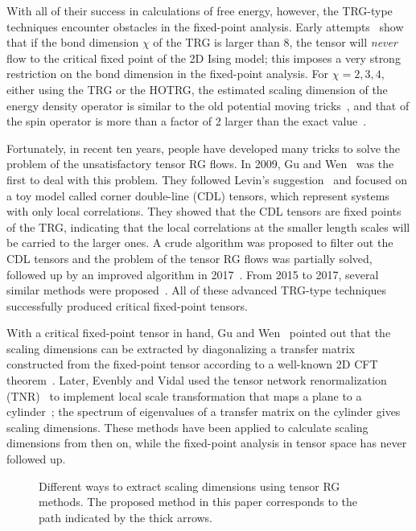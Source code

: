 \documentclass[aps,prr,reprint,superscriptaddress,floatfix]{revtex4-2}
\begin{document}
With all of their success in calculations of free energy, however, the TRG-type techniques encounter obstacles in the fixed-point analysis. 
Early attempts~\cite{Berker2008,aoki2009,meurice2013,kadanoff2014} show that if the bond dimension $\chi$ of the TRG is larger than 8, the tensor will \textit{never} flow to the critical fixed point of the 2D Ising model; this imposes a very strong restriction on the bond dimension in the fixed-point analysis.
For $\chi = 2, 3, 4$, either using the TRG or the HOTRG, the estimated scaling dimension of the energy density operator is similar to the old potential moving tricks~\cite{Berker2008,aoki2009,meurice2013}, and that of the spin operator is more than a factor of 2 larger than the exact value~\cite{kadanoff2014}. 
%

Fortunately, in recent ten years, people have developed many tricks to solve the problem of the unsatisfactory tensor RG flows.
In 2009, Gu and Wen~\cite{GuWen2009} was the first to deal with this problem. 
They followed Levin's suggestion~\cite{trg,LevinTalk} and focused on a toy model called corner double-line (CDL) tensors, which represent systems with only local correlations. 
They showed that the CDL tensors are fixed points of the TRG, indicating that the local correlations at the smaller length scales will be carried to the larger ones. 
A crude algorithm was proposed to filter out the CDL tensors and the problem of the tensor RG flows was partially solved, followed up by an improved algorithm in 2017~\cite{looptnr}. 
From 2015 to 2017, several similar methods were proposed~\cite{tnr,tnralgo,tnrplus}. 
All of these advanced TRG-type techniques successfully produced critical fixed-point tensors. 
%

With a critical fixed-point tensor in hand, Gu and Wen~\cite{GuWen2009} pointed out that the scaling dimensions can be extracted by diagonalizing a transfer matrix constructed from the fixed-point tensor according to a well-known 2D CFT theorem~\cite{cardy1986}. 
Later, Evenbly and Vidal used the tensor network renormalization (TNR)~\cite{tnr,tnralgo} to implement local scale transformation that maps a plane to a cylinder~\cite{EvenblyDilatationOp}; the spectrum of eigenvalues of a transfer matrix on the cylinder gives scaling dimensions.
These methods have been applied to calculate scaling dimensions from then on, while the fixed-point analysis in tensor space has never followed up.
%
\begin{figure}[tb]
    \caption{\label{fig:researchBG}
        Different ways to extract scaling dimensions using tensor RG methods.
        The proposed method in this paper corresponds to the path indicated by the thick arrows.
    }
\end{figure}
\end{document}
